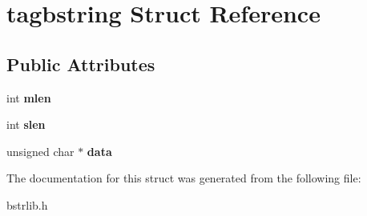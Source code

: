 \hypertarget{structtagbstring}{}\section{tagbstring Struct Reference}
\label{structtagbstring}
\subsection*{Public Attributes}
\begin{DoxyCompactItemize}
\item 
\hypertarget{structtagbstring_abf47839da62089f74883d8324f5ef539}{}int {\bfseries mlen}\label{structtagbstring_abf47839da62089f74883d8324f5ef539}

\item 
\hypertarget{structtagbstring_af9a7862da5259ad58776f27cbab88180}{}int {\bfseries slen}\label{structtagbstring_af9a7862da5259ad58776f27cbab88180}

\item 
\hypertarget{structtagbstring_aeacc0105c2eed78dcc0647f89898821f}{}unsigned char $\ast$ {\bfseries data}\label{structtagbstring_aeacc0105c2eed78dcc0647f89898821f}

\end{DoxyCompactItemize}


The documentation for this struct was generated from the following file\+:\begin{DoxyCompactItemize}
\item 
bstrlib.\+h\end{DoxyCompactItemize}
